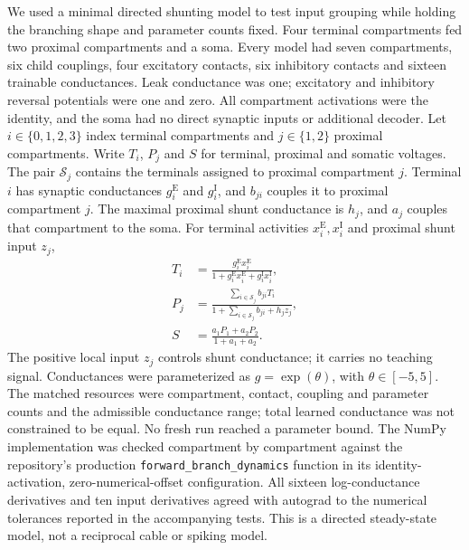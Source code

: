 We used a minimal directed shunting model to test input grouping while holding the branching shape and parameter counts fixed. Four terminal compartments fed two proximal compartments and a soma. Every model had seven compartments, six child couplings, four excitatory contacts, six inhibitory contacts and sixteen trainable conductances. Leak conductance was one; excitatory and inhibitory reversal potentials were one and zero. All compartment activations were the identity, and the soma had no direct synaptic inputs or additional decoder. Let $i\in\{0,1,2,3\}$ index terminal compartments and $j\in\{1,2\}$ proximal compartments. Write $T_i$, $P_j$ and $S$ for terminal, proximal and somatic voltages. The pair $\mathcal S_j$ contains the terminals assigned to proximal compartment $j$. Terminal $i$ has synaptic conductances $g_i^{\mathrm E}$ and $g_i^{\mathrm I}$, and $b_{ji}$ couples it to proximal compartment $j$. The maximal proximal shunt conductance is $h_j$, and $a_j$ couples that compartment to the soma. For terminal activities $x_i^{\mathrm E},x_i^{\mathrm I}$ and proximal shunt input $z_j$,
\begin{align}
T_i&=\frac{g_i^{\mathrm E}x_i^{\mathrm E}}
 {1+g_i^{\mathrm E}x_i^{\mathrm E}+g_i^{\mathrm I}x_i^{\mathrm I}},\\
P_j&=\frac{\sum_{i\in\mathcal S_j}b_{ji}T_i}
 {1+\sum_{i\in\mathcal S_j}b_{ji}+h_jz_j},\\
S&=\frac{a_1P_1+a_2P_2}{1+a_1+a_2}.
\end{align}
The positive local input $z_j$ controls shunt conductance; it carries no teaching signal. Conductances were parameterized as $g=\exp(\theta)$, with $\theta\in[-5,5]$. The matched resources were compartment, contact, coupling and parameter counts and the admissible conductance range; total learned conductance was not constrained to be equal. No fresh run reached a parameter bound. The NumPy implementation was checked compartment by compartment against the repository's production \texttt{forward\_branch\_dynamics} function in its identity-activation, zero-numerical-offset configuration. All sixteen log-conductance derivatives and ten input derivatives agreed with autograd to the numerical tolerances reported in the accompanying tests. This is a directed steady-state model, not a reciprocal cable or spiking model.

